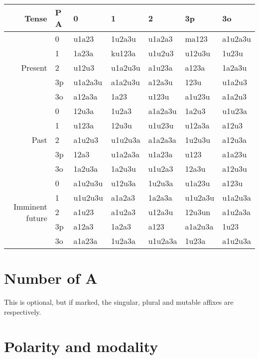 \documentclass{book}
\begin{document}
\begin{table}[h!]
  \caption{Interactions with the root.}
  \label{table:conjugation0}
  \centering
  \begin{longtable}[c]{r|l|lllll}
    Tense & P \bs{} A & 0 & 1 & 2 & 3p & 3o \\
    \hline
    \multirow{5}{*}{Present} & 0 & u1a23 & 1u2a3u & u1a2a3 & ma123 & a1u2a3u \\
    & 1 & 1a23a & ku123a & u1u2u3 & u12u3u & 1u23u \\
    & 2 & u12u3 & u1a2u3u & a1u23a & a123a & 1a2a3u \\
    & 3p & u1a2a3u & a1a2u3u & a12a3u & 123u & u1a2u3 \\
    & 3o & a12a3a & 1a23 & u123u & a1u23u & a1a2u3 \\
    \hline
    \multirow{5}{*}{Past} & 0 & 12u3a & 1u2a3 & a1a2a3u & 1a2u3 & u1u23a \\
    & 1 & u123a & 12u3u & u1u23u & u12a3a & a12u3 \\
    & 2 & a1u2u3 & u1u2u3a & a1a2a3a & 1u2u3u & a12u3a \\
    & 3p & 12a3 & u1a2a3a & u1a23a & u123 & a1a23u \\
    & 3o & 1a2u3a & 1a2u3u & u1u2a3 & 12a3u & a12u3u \\
    \hline
    \multirow{5}{*}{Imminent future} & 0 & a1u2u3u & u12u3a & 1u2u3a & u1a23u & a123u \\
    & 1 & u1u2u3u & a1a2a3 & 1a2a3a & u1u2a3u & u1a2u3a \\
    & 2 & a1u23 & a1u2a3 & u12a3u & 12u3un & a1u2a3a \\
    & 3p & a12a3 & 1a2a3 & a123 & a1a2u3a & 1u23 \\
    & 3o & a1a23a & 1u2a3a & u1u2a3a & 1u23a & a1u2u3a \\
    \hline
  \end{longtable}
\end{table}

\section{Number of A}

This is optional, but if marked, the singular, plural and mutable affixes are  respectively.

\section{Polarity and modality}
\end{document}
